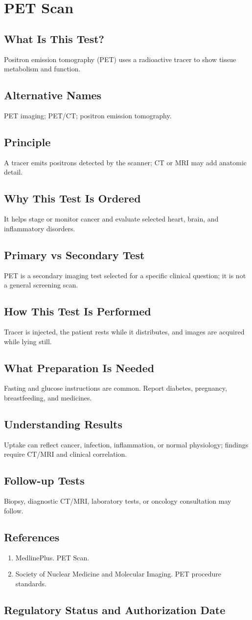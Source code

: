 \chapter{PET Scan}
\section*{What Is This Test?} Positron emission tomography (PET) uses a radioactive tracer to show tissue metabolism and function.\section*{Alternative Names} PET imaging; PET/CT; positron emission tomography.\section*{Principle} A tracer emits positrons detected by the scanner; CT or MRI may add anatomic detail.\section*{Why This Test Is Ordered} It helps stage or monitor cancer and evaluate selected heart, brain, and inflammatory disorders.\section*{Primary vs Secondary Test} PET is a secondary imaging test selected for a specific clinical question; it is not a general screening scan.\section*{How This Test Is Performed} Tracer is injected, the patient rests while it distributes, and images are acquired while lying still.\section*{What Preparation Is Needed} Fasting and glucose instructions are common. Report diabetes, pregnancy, breastfeeding, and medicines.\section*{Understanding Results} Uptake can reflect cancer, infection, inflammation, or normal physiology; findings require CT/MRI and clinical correlation.\section*{Follow-up Tests} Biopsy, diagnostic CT/MRI, laboratory tests, or oncology consultation may follow.\section*{References} \begin{enumerate}\item MedlinePlus. PET Scan.\item Society of Nuclear Medicine and Molecular Imaging. PET procedure standards.\end{enumerate}\clearpage\section*{Regulatory Status and Authorization Date}\clearpage
